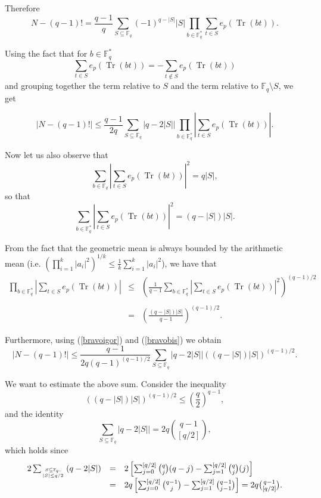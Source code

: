 \documentclass{amsart}
\def\TR{\operatorname{Tr}}
\begin{document}
Therefore
$$
N-(q-1)! =\frac{q-1}{q}\sum_{S\subseteq \mathbb F_q}
(-1)^{q-|S|}|S|\prod_{b\in \mathbb F_q^*}\sum_{t\in S}
e_p(\TR(bt)).
$$

Using the fact that for $b \in\mathbb F_q^*$
$$\sum_{t \in S} e_p(\TR(bt)) =
-\sum_{t \not \in S}  e_p(\TR(bt))$$
and grouping together the term relative to $S$ and the term relative
to $\mathbb F_q\setminus S$, we get

\begin{equation}\label{bravoigor} \left| N-(q-1)! \right|\leq \frac{q-1}{2q}\sum_{S\subseteq
\mathbb F_q}\left|q-2|S|\right| \prod_{b\in \mathbb
F_q^*}\left|\sum_{t\in S} e_p(\TR(bt))\right|.
\end{equation}

Now let us also observe that
$$
\sum_{b\in \mathbb F_q}\left|\sum_{t\in S}
e_p(\TR(bt))\right|^2=q|S|,
$$
so that
$$
\sum_{b\in \mathbb F_q^*}\left|\sum_{t\in S}
e_p(\TR(bt))\right|^2=(q-|S|)|S|.
$$

{From} the fact that the geometric mean is always bounded by the
arithmetic mean (i.e. $(\prod_{i=1}^k |a_i|^2)^{1/k} \leq
\frac{1}{k}\sum_{i=1}^k |a_i|^2$), we have that
\begin{equation}\begin{array}{rcl}
\displaystyle{\prod_{b\in \mathbb F_q^*}\left|\sum_{t\in S}
e_p(\TR(bt))\right|}&\displaystyle{\leq}&
\displaystyle{\left(\frac{1}{q-1} \sum_{b\in \mathbb
F_q^*}\left|\sum_{t\in S} e_p(\TR(bt))\right|^2
\right)^{(q-1)/2}}\\
\\
&=&\displaystyle{\left(\frac{(q-|S|)|S|}{q-1}\right)^{(q-1)/2}}.
\end{array}\label{bravobis}\end{equation}

Furthermore, using (\ref{bravoigor}) and (\ref{bravobis}) we
obtain
\begin{equation}\left| N-(q-1)! \right|\leq
\frac{q-1}{2q(q-1)^{(q-1)/2}}\sum_{S\subseteq \mathbb
F_q}\left|q-2|S|\right| \left((q-|S|)|S|\right)^{(q-1)/2}.
\label{fine}\end{equation}

We want to estimate the above sum. Consider the inequality
\begin{equation}\label{finebis}
\left((q-|S|)|S|\right)^{(q-1)/2}\le
\left(\frac{q}{2}\right)^{q-1},\end{equation}
and the identity
\begin{equation}\label{bino}
\sum_{S\subseteq \mathbb F_q}\left|q-2|S|\right|
=2q\binom{q-1}{[q/2]},
\end{equation}
which holds since
$$
\begin{array}{rcl}
2\sum_{\genfrac{}{}{0pt}{}{S\subseteq \mathbb F_q,}{|S|\leq q/2}}\left(q-2|S|\right)&=&
2\left[\sum_{j=0}^{[q/2]}\binom{q}{j}(q-j)-
\sum_{j=1}^{[q/2]}\binom{q}{j}(j)\right]\\
&=&2q \left[\sum_{j=0}^{[q/2]}\binom{q-1}{j}-
\sum_{j=1}^{[q/2]}\binom{q-1}{j-1}\right]=2q\binom{q-1}{[q/2]}.
\end{array}
$$
\end{document}
